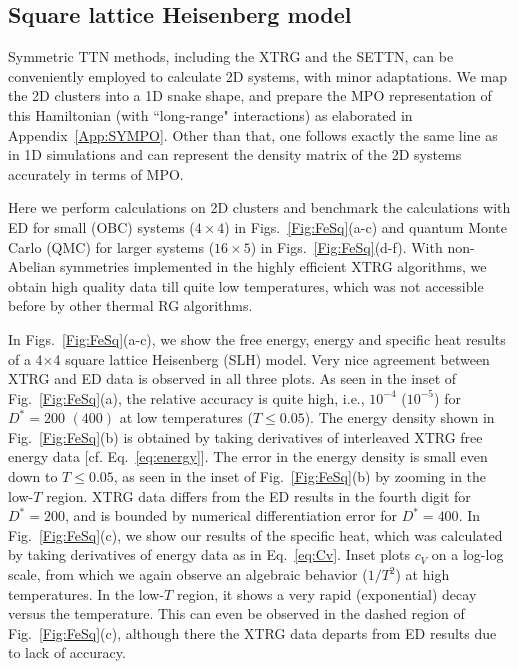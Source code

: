 \documentclass[aps,prx,twocolumn,showpacs,psfig,superscriptaddress,longbibliography]{revtex4-1}
\newcommand{\App}[1]{Appendix~\ref{#1}}
\newcommand{\Eq}[1]{Eq.~\eqref{#1}}
\newcommand{\Fig}[1]{Fig.~\ref{#1}}
\def\Dstar{D^\ast}
\begin{document}
\subsection{Square lattice Heisenberg model}
\label{Sec:2DHeisenberg}

Symmetric TTN methods, including the XTRG and the SETTN, can be
conveniently employed to calculate 2D systems, with minor
adaptations. We map the 2D clusters into a 1D snake shape, and
prepare the MPO representation of this Hamiltonian (with
``long-range" interactions) as elaborated in \App{App:SYMPO}.  Other
than that, one follows exactly the same line as in 1D simulations
and can represent the density matrix of the 2D systems accurately in
terms of MPO.  

Here we perform calculations on 2D clusters and benchmark the
calculations with ED for small (OBC) systems ($4\times4$) in
Figs.~\ref{Fig:FeSq}(a-c) and quantum Monte Carlo (QMC) for larger
systems ($16\times5$) in Figs.~\ref{Fig:FeSq}(d-f).  With
non-Abelian symmetries implemented in the highly efficient XTRG
algorithms, we obtain high quality data till quite low temperatures,
which was not accessible before by other thermal RG algorithms.

In Figs.~\ref{Fig:FeSq}(a-c), we show the free energy, energy and
specific heat results of a 4$\times$4 square lattice Heisenberg (SLH) model.
Very nice agreement between XTRG and ED data is observed in all
three plots.  As seen in the inset of Fig.~\ref{Fig:FeSq}(a), the
relative accuracy is quite high, i.e., $10^{-4}$ ($10^{-5}$) for
$\Dstar=200$ $(400)$ at low temperatures ($T\leq 0.05$).  The energy
density shown in \Fig{Fig:FeSq}(b)  {is} obtained by taking
derivatives of interleaved XTRG free energy data [cf.
\Eq{eq:energy}].  The error in the energy density is small even down
to $T\leq0.05$, as seen in the inset of \Fig{Fig:FeSq}(b) by
zooming in the low-$T$ region. XTRG data  {differs} from the ED
results in the fourth digit for $\Dstar=200$, and is bounded by
numerical differentiation error for $\Dstar=400$.  In
\Fig{Fig:FeSq}(c), we show our results of the specific heat, which
was calculated by taking derivatives of energy data as in
\Eq{eq:Cv}.  Inset plots $c_V$ on a log-log scale, from which we
again observe an algebraic behavior ($1/T^2$) at high temperatures.
In the low-$T$ region, it shows a very rapid (exponential) decay
versus the temperature. This can even be observed in the dashed
region of \Fig{Fig:FeSq}(c), although there the XTRG data  {departs}
from ED results due to lack of accuracy.
\end{document}
